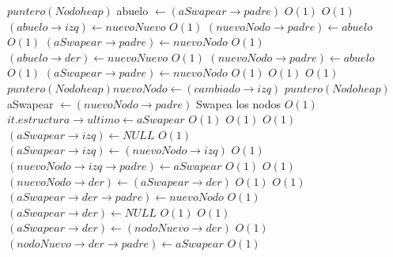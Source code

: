 \begin{Algoritmos}
\begin{algorithmic}[1]
					\Else
					\State $puntero(Nodoheap)$ abuelo $\gets (aSwapear \rightarrow padre)$ \Comment $O(1)$
						 \Comment $O(1)$
							\State $(abuelo \rightarrow izq) \gets nuevoNuevo$ \Comment $O(1)$
							\State $(nuevoNodo \rightarrow padre) \gets abuelo$ \Comment $O(1)$
							\State $(aSwapear \rightarrow padre) \gets nuevoNodo$ \Comment $O(1)$
						\Else
							\State $(abuelo \rightarrow der) \gets nuevoNuevo$ \Comment $O(1)$
							\State $(nuevoNodo \rightarrow padre) \gets abuelo$ \Comment $O(1)$
							\State $(aSwapear \rightarrow padre) \gets nuevoNodo$ \Comment $O(1)$
						\EndIf
					\EndIf
					\EndIf					
				\EndWhile
				 \Comment $O(1)$
					 \Comment $O(1)$
						\State $puntero(Nodoheap) nuevoNodo \gets (cambiado \rightarrow izq)$						
						\State $puntero(Nodoheap)$ aSwapear $\gets (nuevoNodo \rightarrow padre)$
    		 \Comment Swapea los nodos $O(1)$
    			\State $it.estructura \rightarrow ultimo \gets aSwapear$ \Comment $O(1)$
    		\EndIf
			 \Comment $O(1)$
						 \Comment $O(1)$
								\State $(aSwapear \rightarrow izq) \gets NULL$ \Comment $O(1)$
							\Else
								\State $(aSwapear \rightarrow izq) \gets (nuevoNodo \rightarrow izq)$ \Comment $O(1)$
								\State $(nuevoNodo \rightarrow izq \rightarrow padre) \gets aSwapear$ \Comment $O(1)$
							\EndIf
							 \Comment $O(1)$
								\State $(nuevoNodo \rightarrow der) \gets (aSwapear \rightarrow der)$ \Comment $O(1)$
								 \Comment $O(1)$
								\State $(aSwapear \rightarrow der \rightarrow padre) \gets nuevoNodo$	 \Comment $O(1)$						
								\EndIf
								\State $(aSwapear \rightarrow der) \gets NULL$ \Comment $O(1)$
							\Else
								 \Comment $O(1)$
									\State $(aSwapear \rightarrow der) \gets (nodoNuevo \rightarrow der)$ \Comment $O(1)$
									\State $(nodoNuevo \rightarrow der \rightarrow padre) \gets aSwapear$ \Comment $O(1)$

\end{algorithmic}
\end{Algoritmos}
